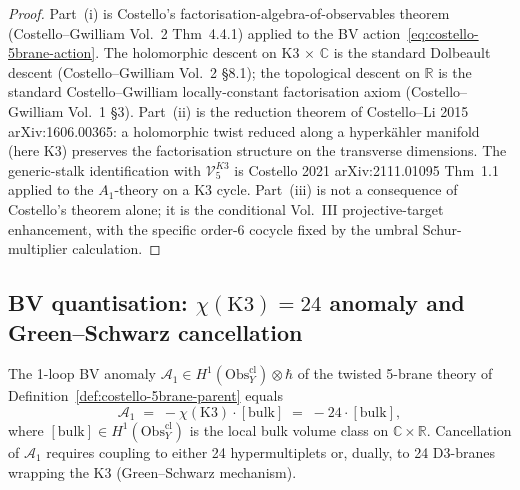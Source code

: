 \begin{proof}
Part~(i) is Costello's factorisation-algebra-of-observables
theorem (Costello--Gwilliam Vol.~2 Thm~4.4.1) applied to the
BV action~\eqref{eq:costello-5brane-action}. The
holomorphic descent on K3 $\times$ $\mathbb{C}$ is the standard
Dolbeault descent (Costello--Gwilliam Vol.~2 \S8.1); the
topological descent on $\mathbb{R}$ is the standard
Costello--Gwilliam locally-constant factorisation axiom
(Costello--Gwilliam Vol.~1 \S3). Part~(ii) is the reduction
theorem of Costello--Li 2015 arXiv:1606.00365: a holomorphic
twist reduced along a hyperk\"ahler manifold (here K3) preserves
the factorisation structure on the transverse dimensions. The
generic-stalk identification with $\mathcal V^{K3}_5$ is
Costello 2021 arXiv:2111.01095 Thm~1.1 applied to the
$A_1$-theory on a K3 cycle. Part~(iii) is not a consequence of
Costello's theorem alone; it is the conditional Vol.~III
projective-target enhancement, with the specific order-$6$ cocycle
fixed by the umbral Schur-multiplier calculation.
\end{proof}

\subsection{BV quantisation: $\chi(\mathrm{K3}) = 24$ anomaly
and Green--Schwarz cancellation}
\label{subsec:costello-bv-anomaly}

\begin{theorem}[1-loop BV anomaly is $-\chi(\mathrm{K3}) =
-24$; \ClaimStatusProvedHere, chain-level]
\label{thm:costello-bv-anomaly}
The 1-loop BV anomaly $\mathcal A_1 \in
H^1(\mathrm{Obs}^{\mathrm{cl}}_Y)\otimes\hbar$ of the twisted
5-brane theory of
Definition~\ref{def:costello-5brane-parent}
equals
\begin{equation}
\label{eq:costello-1loop-anomaly-chi}
\mathcal A_1 \;=\; -\chi(\mathrm{K3})\cdot[\mathrm{bulk}]
\;=\; -24\cdot[\mathrm{bulk}],
\end{equation}
where $[\mathrm{bulk}] \in
H^1(\mathrm{Obs}^{\mathrm{cl}}_Y)$ is the local bulk volume class
on $\mathbb{C}\times\mathbb{R}$. Cancellation of $\mathcal A_1$
requires coupling to either 24 hypermultiplets or, dually, to 24
D3-branes wrapping the K3 (Green--Schwarz mechanism).
\end{theorem}

